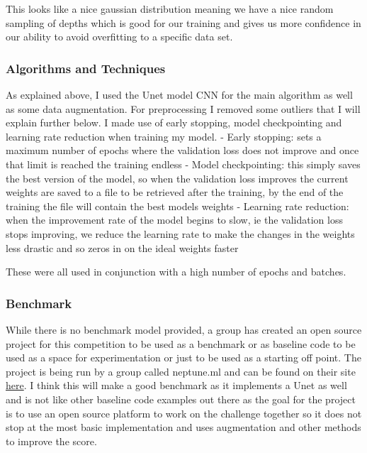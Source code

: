 \documentclass[11pt]{article}
\begin{document}
This looks like a nice gaussian distribution meaning we have a nice
random sampling of depths which is good for our training and gives us
more confidence in our ability to avoid overfitting to a specific data
set.

\subsubsection{Algorithms and
Techniques}\label{algorithms-and-techniques}

As explained above, I used the Unet model CNN for the main algorithm as
well as some data augmentation. For preprocessing I removed some
outliers that I will explain further below. I made use of early
stopping, model checkpointing and learning rate reduction when training
my model. - Early stopping: sets a maximum number of epochs where the
validation loss does not improve and once that limit is reached the
training endless - Model checkpointing: this simply saves the best
version of the model, so when the validation loss improves the current
weights are saved to a file to be retrieved after the training, by the
end of the training the file will contain the best models weights -
Learning rate reduction: when the improvement rate of the model begins
to slow, ie the validation loss stops improving, we reduce the learning
rate to make the changes in the weights less drastic and so zeros in on
the ideal weights faster

These were all used in conjunction with a high number of epochs and
batches.

\subsubsection{Benchmark}\label{benchmark}

While there is no benchmark model provided, a group has created an open
source project for this competition to be used as a benchmark or as
baseline code to be used as a space for experimentation or just to be
used as a starting off point. The project is being run by a group called
neptune.ml and can be found on their site
\href{https://app.neptune.ml/neptune-ml/Salt-Detection?namedFilterId=about}{here}.
I think this will make a good benchmark as it implements a Unet as well
and is not like other baseline code examples out there as the goal for
the project is to use an open source platform to work on the challenge
together so it does not stop at the most basic implementation and uses
augmentation and other methods to improve the score.
\end{document}
